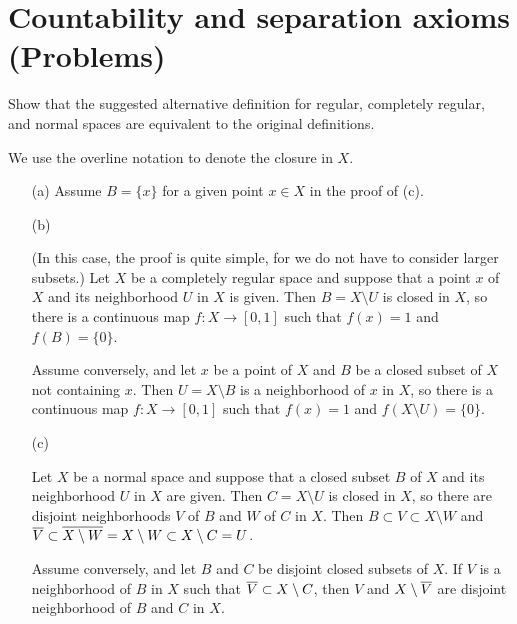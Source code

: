 \section{Countability and separation axioms (Problems)}

\begin{prob}\label{separability equivalences}
    Show that the suggested alternative definition for regular, completely regular, and normal spaces are equivalent to the original definitions.
\end{prob}
\begin{sol}
    We use the overline notation to denote the closure in $X$.
    \begin{enumerate}
        \item[(a)]
        {
            Assume $B=\{x\}$ for a given point $x\in X$ in the proof of (c).
        }
        \item[(b)]
        {
            (In this case, the proof is quite simple, for we do not have to consider larger subsets.)
            Let $X$ be a completely regular space and suppose that a point $x$ of $X$ and its neighborhood $U$ in $X$ is given.
            Then $B=X\setminus U$ is closed in $X$, so there is a continuous map $f: X\rightarrow [0, 1]$ such that $f(x)=1$ and $f(B)=\{0\}$.

            Assume conversely, and let $x$ be a point of $X$ and $B$ be a closed subset of $X$ not containing $x$.
            Then $U=X\setminus B$ is a neighborhood of $x$ in $X$, so there is a continuous map $f: X\rightarrow [0, 1]$ such that $f(x)=1$ and $f(X\setminus U)=\{0\}$.
        }
        \item[(c)]
        {
            Let $X$ be a normal space and suppose that a closed subset $B$ of $X$ and its neighborhood $U$ in $X$ are given.
            Then $C=X\setminus U$ is closed in $X$, so there are disjoint neighborhoods $V$ of $B$ and $W$ of $C$ in $X$.
            Then $B\subset V\subset X\setminus W$ and $\overline{V}\subset\overline{X\setminus W}=X\setminus W\subset X\setminus C=U$.

            Assume conversely, and let $B$ and $C$ be disjoint closed subsets of $X$.
            If $V$ is a neighborhood of $B$ in $X$ such that $\overline{V}\subset X\setminus C$, then $V$ and $X\setminus\overline{V}$ are disjoint neighborhood of $B$ and $C$ in $X$.
        }
    \end{enumerate}   
\end{sol}

